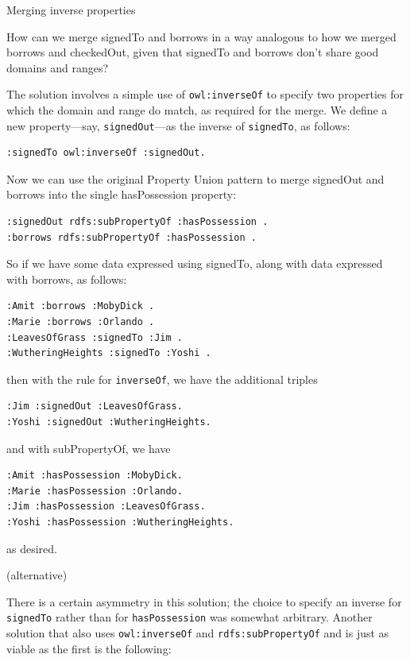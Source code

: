\begin{challenge}{Merging inverse properties}

How can we merge signedTo and borrows in a way analogous to how we
merged borrows and
checkedOut, given that signedTo and borrows don't share good domains and
ranges?

\solution

The solution involves a simple use of \texttt{owl:inverseOf} to specify two
properties for which the domain and range do match, as required for the
merge. We define a new property---say, \texttt{signedOut}---as the inverse of
\texttt{signedTo}, as follows:

\begin{lstlisting}
:signedTo owl:inverseOf :signedOut.
\end{lstlisting}

Now we can use the original Property Union pattern to merge signedOut
and borrows into the single
hasPossession property:

\begin{lstlisting}
:signedOut rdfs:subPropertyOf :hasPossession .
:borrows rdfs:subPropertyOf :hasPossession .
\end{lstlisting}

So if we have some data expressed using signedTo, along with data
expressed with borrows, as follows:

\begin{lstlisting}
:Amit :borrows :MobyDick .
:Marie :borrows :Orlando .
:LeavesOfGrass :signedTo :Jim .
:WutheringHeights :signedTo :Yoshi .
\end{lstlisting}

then with the rule for \texttt{inverseOf}, we have the additional triples

\begin{lstlisting}
:Jim :signedOut :LeavesOfGrass.
:Yoshi :signedOut :WutheringHeights.
\end{lstlisting}

and with subPropertyOf, we have

\begin{lstlisting}
:Amit :hasPossession :MobyDick.
:Marie :hasPossession :Orlando.
:Jim :hasPossession :LeavesOfGrass.
:Yoshi :hasPossession :WutheringHeights.
\end{lstlisting}

as desired.

\solution (alternative)

There is a certain asymmetry in this solution; the choice to specify an
inverse for \texttt{signedTo} rather than for \texttt{hasPossession} was somewhat
arbitrary. Another solution that also uses \texttt{owl:inverseOf} and
\texttt{rdfs:subPropertyOf} and is just as viable as the first is the following:


\end{challenge}

